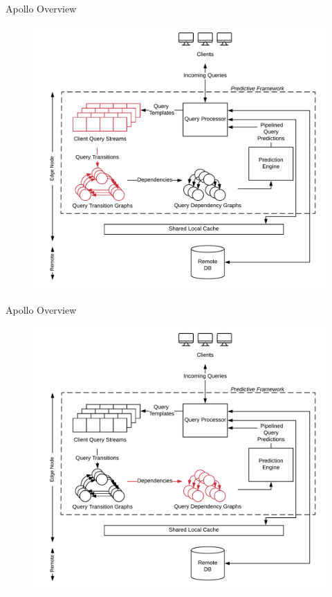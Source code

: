 \documentclass[10pt]{beamer}
\begin{document}
\begin{frame}[fragile]{Apollo Overview}
    \begin{figure}
        \hspace*{-1cm}
        \includegraphics[scale=0.13]{apollo_overview_3}
    \end{figure}
\end{frame}

\begin{frame}[fragile]{Apollo Overview}
    \begin{figure}
        \hspace*{-1cm}
        \includegraphics[scale=0.13]{apollo_overview_4}
    \end{figure}
\end{frame}
\end{document}
